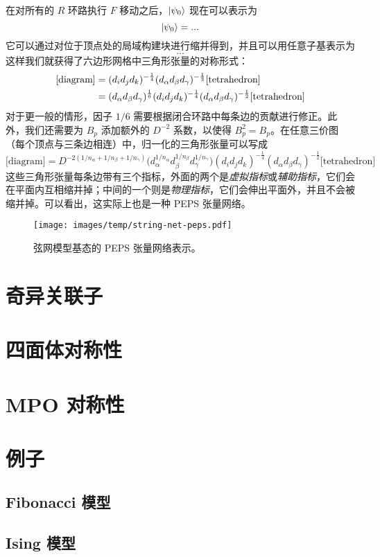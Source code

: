 在对所有的 $R$ 环路执行 $F$ 移动之后，$\ket{\psi_0}$ 现在可以表示为
\begin{equation}
  \ket{\psi_0} = ...
\end{equation}
它可以通过对位于顶点处的局域构建块进行缩并得到，并且可以用任意子基表示为
\begin{equation}
  ...
\end{equation}
这样我们就获得了六边形网格中三角形张量的对称形式：
\begin{align}
  \text{[diagram]}
  &= (d_i d_j d_k)^{-\frac14} (d_\alpha d_\beta d_\gamma)^{-\frac13} \text{[tetrahedron]} \notag \\
  &= (d_\alpha d_\beta d_\gamma)^{\frac16} (d_i d_j d_k)^{-\frac14} (d_\alpha d_\beta d_\gamma)^{-\frac12} \text{[tetrahedron]}
  \label{eq:unit-of-string-net-honeycomb}
\end{align}
对于更一般的情形，因子 $1/6$ 需要根据闭合环路中每条边的贡献进行修正。此外，我们还需要为 $B_p$ 添加额外的 $D^{-2}$ 系数，以使得 $B_p^2=B_p$。在任意三价图（每个顶点与三条边相连）中，归一化的三角形张量可以写成
\begin{equation}
  \text{[diagram]}
  = D^{-2 (1/n_\alpha + 1/n_\beta + 1/n_\gamma)}
    \bigl( d_\alpha^{1/n_\alpha} d_\beta^{1/n_\beta} d_\gamma^{1/n_\gamma} \bigr)
    (d_i d_j d_k)^{-\frac14} (d_\alpha d_\beta d_\gamma)^{-\frac12} \text{[tetrahedron]}
  \label{eq:unit-of-string-net-general}
\end{equation}
这些三角形张量每条边带有三个指标，外面的两个是\emph{虚拟指标}或\emph{辅助指标}，它们会在平面内互相缩并掉；中间的一个则是\emph{物理指标}，它们会伸出平面外，并且不会被缩并掉。可以看出，这实际上也是一种 PEPS 张量网络。

\begin{figure}[htb]
  \centering
  \texttt{[image: images/temp/string-net-peps.pdf]}
  \caption[弦网模型基态的 PEPS 张量网络表示]{弦网模型基态的 PEPS 张量网络表示。}
  \label{fig:string-net-peps}
\end{figure}

\section{奇异关联子}

\section{四面体对称性}

\section{MPO 对称性}

\section{例子}

\subsection{Fibonacci 模型}

\subsection{Ising 模型}
